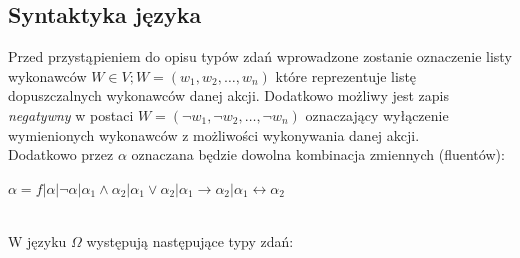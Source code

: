 \documentclass{article}
\begin{document}
\subsection{Syntaktyka języka}
Przed przystąpieniem do opisu typów zdań wprowadzone zostanie oznaczenie listy wykonawców $W \in V; W=(w_{1}, w_{2}, \dots, w_{n})$ które reprezentuje listę dopuszczalnych wykonawców danej akcji. Dodatkowo możliwy jest zapis \textit{negatywny} w postaci $W=(\neg w_{1}, \neg w_{2}, \dots, \neg w_{n})$ oznaczający wyłączenie wymienionych wykonawców z możliwości wykonywania danej akcji.\\
Dodatkowo przez $\alpha$ oznaczana będzie dowolna kombinacja zmiennych (fluentów): 
\begin{center}
$\alpha= f | \alpha | \neg\alpha | \alpha_{1} \land \alpha_{2} | \alpha_{1} \lor \alpha_{2} | \alpha_{1} \to \alpha_{2} | \alpha_{1} \leftrightarrow \alpha_{2} $
\end{center}\\
W języku  $\Omega$ występują następujące typy zdań:
\end{document}
